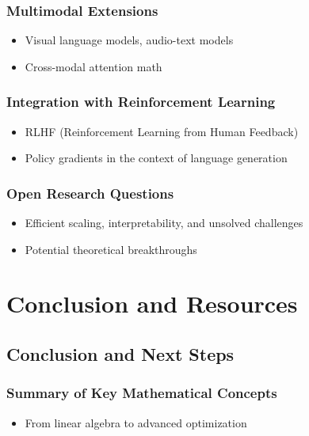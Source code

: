 \documentclass[12pt]{book}
\begin{document}
\section{Multimodal Extensions}
\begin{itemize}
    \item Visual language models, audio-text models
    \item Cross-modal attention math
\end{itemize}

\section{Integration with Reinforcement Learning}
\begin{itemize}
    \item RLHF (Reinforcement Learning from Human Feedback)
    \item Policy gradients in the context of language generation
\end{itemize}

\section{Open Research Questions}
\begin{itemize}
    \item Efficient scaling, interpretability, and unsolved challenges
    \item Potential theoretical breakthroughs
\end{itemize}


\part{Conclusion and Resources}

\chapter{Conclusion and Next Steps}
\section{Summary of Key Mathematical Concepts}
\begin{itemize}
    \item From linear algebra to advanced optimization
\end{itemize}
\end{document}
